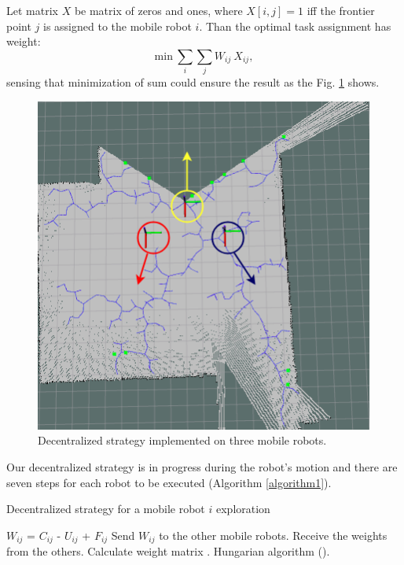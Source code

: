 \documentclass[letterpaper, 10 pt, conference]{ieeeconf}  %
\begin{document}
Let matrix $X$ be matrix of zeros and ones, where $X[i,j]=1$ iff the frontier point $j$ is assigned to the mobile robot $i$.
Than the optimal task assignment has weight:
\begin{equation}
     {\mathrm{min}}\ \sum_{i} \sum_{j} W_{ij}\ X_{ij},
\end{equation}
sensing that minimization of sum could ensure the result as the Fig. \ref{fig:start} shows. 

\begin{figure}[t!]
	\centering\includegraphics[width=0.9\columnwidth]{start.png}
	\caption {Decentralized strategy implemented on three mobile robots.}
	\label{fig:start}
\end{figure}

Our decentralized strategy is in progress during the robot's motion and there are seven steps for each robot to be executed (Algorithm \ref{algorithm1}).    

\begin{algorithm}[h!]
\caption{Decentralized strategy for a mobile robot $i$ exploration}
\label{algorithm1}
\begin{algorithmic}[1]
\State\hspace{\algorithmicindent} $W_{ij}$ = $C_{ij}$ - $U_{ij}$ + $F_{ij}$
\State\hspace{\algorithmicindent} Send $W_{ij}$ to the other mobile robots.
\State \hspace{\algorithmicindent} Receive the weights from the others.
\State \hspace{\algorithmicindent} Calculate weight matrix .
\State \hspace{\algorithmicindent} Hungarian algorithm ().
\end{algorithmic}
\end{algorithm}
\end{document}
